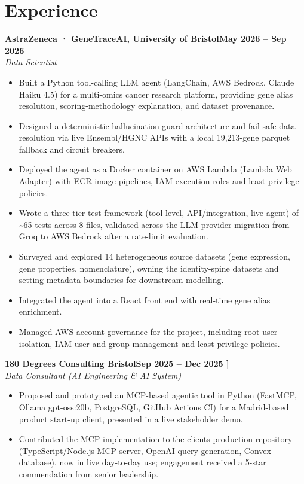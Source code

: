 \documentclass[a4paper,11pt]{article}
\newcommand{\entry}[4]{\needspace{4\baselineskip}\noindent\textbf{#1}\hfill\textbf{#2}\\ \textit{#3}\hfill\textit{#4}\par}
\begin{document}
\section{Experience}
\entry{AstraZeneca · GeneTraceAI, University of Bristol}{May 2026 – Sep 2026}{Data Scientist}{}
\begin{itemize}
  \item Built a Python tool-calling LLM agent (LangChain, AWS Bedrock, Claude Haiku 4.5) for a multi-omics cancer research platform, providing gene alias resolution, scoring-methodology explanation, and dataset provenance.
  \item Designed a deterministic hallucination-guard architecture and fail-safe data resolution via live Ensembl/HGNC APIs with a local 19,213-gene parquet fallback and circuit breakers.
  \item Deployed the agent as a Docker container on AWS Lambda (Lambda Web Adapter) with ECR image pipelines, IAM execution roles and least-privilege policies.
  \item Wrote a three-tier test framework (tool-level, API/integration, live agent) of \textasciitilde{}65 tests across 8 files, validated across the LLM provider migration from Groq to AWS Bedrock after a rate-limit evaluation.
  \item Surveyed and explored 14 heterogeneous source datasets (gene expression, gene properties, nomenclature), owning the identity-spine datasets and setting metadata boundaries for downstream modelling.
  \item Integrated the agent into a React front end with real-time gene alias enrichment.
  \item Managed AWS account governance for the project, including root-user isolation, IAM user and group management and least-privilege policies.
\end{itemize}
\vspace{4pt}
\entry{180 Degrees Consulting Bristol}{Sep 2025 – Dec 2025   ]}{Data Consultant (AI Engineering \& AI System)}{}
\begin{itemize}
  \item Proposed and prototyped an MCP-based agentic tool in Python (FastMCP, Ollama gpt-oss:20b, PostgreSQL, GitHub Actions CI) for a Madrid-based product start-up client, presented in a live stakeholder demo.
  \item Contributed the MCP implementation to the client\textquotesingle{}s production repository (TypeScript/Node.js MCP server, OpenAI query generation, Convex database), now in live day-to-day use; engagement received a 5-star commendation from senior leadership.
\end{itemize}
\end{document}
